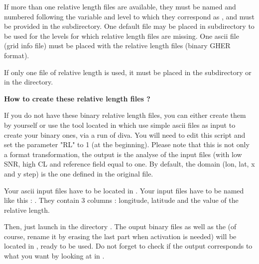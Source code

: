 If more than one relative length files are available, they must be  named and numbered following the variable
and level to which they correspond as , and must be provided in the  
subdirectory. One default file  may be placed in  subdirectory to be used for 
the levels for which relative length files are missing. One  ascii file (grid info file) must be placed
with the relative length files (binary GHER format).

If only one  file of relative length is used, it must be placed in the  subdirectory
or in the  directory.

\textbf{How to create these relative length files ?}

If you do not have these binary relative length files, you can either create them by yourself or use the tool 
located in  which use simple ascii files as input to create your binary ones, via a run of diva. You will 
need to edit this script and set the parameter "RL" to 1 (at the beginning). Please note that this is not only
a format transformation, the output is the analyse of the input files (with low SNR, high CL and reference field
equal to one. By default, the domain (lon, lat, x and y step) is the one defined in the
original  file.

Your ascii input files have to be located in . Your input files have to be named like this : 
. They contain 3 columns : longitude,
latitude and the value of the relative length.

Then, just launch  in the directory . The ouput binary files as well as
the  (of course, rename it by erasing the last part when activation is needed)
will be located in , ready to be used. Do not forget to check if the output 
corresponds to what you want by looking at  in 
.

\begin{center}
\end{center}


